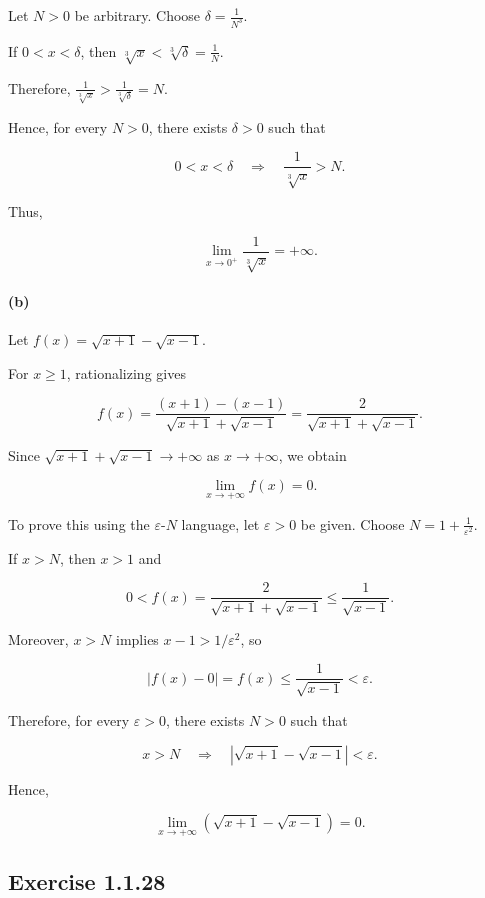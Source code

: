 \documentclass[11pt,a4paper]{article}
\begin{document}
Let \(N>0\) be arbitrary. Choose \(\delta=\frac{1}{N^3}.\)

If \(0<x<\delta\), then \(\sqrt[3]{x}<\sqrt[3]{\delta}=\frac{1}{N}.\)

Therefore, \(\frac{1}{\sqrt[3]{x}}>\frac{1}{\sqrt[3]{\delta}}=N.\)

Hence, for every \(N>0\), there exists \(\delta>0\) such that

\[
0<x<\delta
\quad\Longrightarrow\quad
\frac{1}{\sqrt[3]{x}}>N.
\]

Thus,

\[
\boxed{\displaystyle\lim_{x\to0^+}\frac{1}{\sqrt[3]{x}}=+\infty}.
\]

\paragraph{(b)}\label{b-1}

Let \(f(x)=\sqrt{x+1}-\sqrt{x-1}.\)

For \(x\geq1\), rationalizing gives

\[
f(x)
=\frac{(x+1)-(x-1)}{\sqrt{x+1}+\sqrt{x-1}}
=\frac{2}{\sqrt{x+1}+\sqrt{x-1}}.
\]

Since \(\sqrt{x+1}+\sqrt{x-1}\to+\infty\) as \(x\to+\infty\), we obtain

\[
\lim_{x\to+\infty}f(x)=0.
\]

To prove this using the \(\varepsilon\)-\(N\) language, let
\(\varepsilon>0\) be given. Choose \(N=1+\frac{1}{\varepsilon^2}.\)

If \(x>N\), then \(x>1\) and

\[
0<f(x)
=\frac{2}{\sqrt{x+1}+\sqrt{x-1}}
\leq\frac{1}{\sqrt{x-1}}.
\]

Moreover, \(x>N\) implies \(x-1>1/\varepsilon^2\), so

\[
\left|f(x)-0\right|=f(x)
\leq\frac{1}{\sqrt{x-1}}<\varepsilon.
\]

Therefore, for every \(\varepsilon>0\), there exists \(N>0\) such that

\[
x>N\quad\Longrightarrow\quad
\left|\sqrt{x+1}-\sqrt{x-1}\right|<\varepsilon.
\]

Hence,

\[
\boxed{\displaystyle
\lim_{x\to+\infty}\left(\sqrt{x+1}-\sqrt{x-1}\right)=0}.
\]

\subsection{Exercise 1.1.28}\label{exercise-1.1.28}
\end{document}
